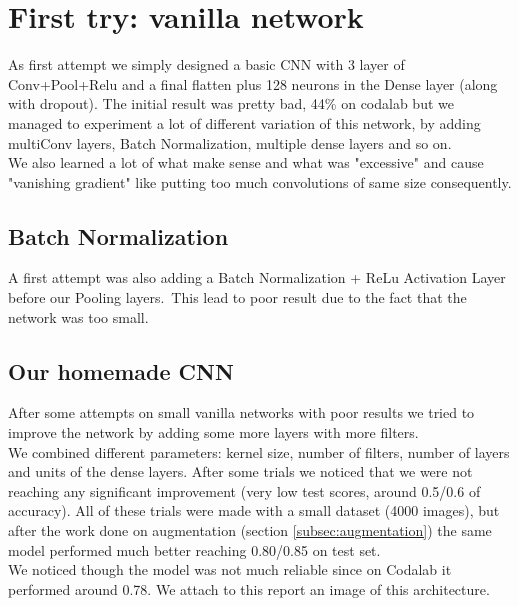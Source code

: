 \documentclass[11pt]{article}
\begin{document}
\section{First try: vanilla network}
As first attempt we simply designed a basic CNN with 3 layer of Conv+Pool+Relu and a final flatten plus 128 neurons in the Dense layer (along with dropout). The initial result was pretty bad, 44\% on codalab but we managed to experiment a lot of different variation of this network, by adding multiConv layers, Batch Normalization, multiple dense layers and so on.\\[0.1cm]
We also learned a lot of what make sense and what was "excessive" and cause "vanishing gradient" like putting too much convolutions of same size consequently.
\subsection{Batch Normalization}
A first attempt was also adding a Batch Normalization + ReLu Activation Layer before our Pooling layers.\
This lead to poor result due to the fact that the network was too small.

\subsection{Our homemade CNN}
After some attempts on small vanilla networks with poor results we tried to improve the network by adding some more layers with more filters.\\[0.1cm]
We combined different parameters: kernel size, number of filters, number of layers and units of the dense layers. After some trials we noticed that we were not reaching any significant improvement (very low test scores, around 0.5/0.6 of accuracy). All of these trials were made with a small dataset (4000 images), but after the work done on augmentation (section \ref{subsec:augmentation}) the same model performed much better reaching 0.80/0.85 on test set.\\[0.1cm]
We noticed though the model was not much reliable since on Codalab it performed around 0.78.
We attach to this report an image of this architecture.
\end{document}
